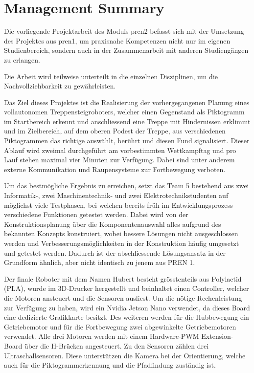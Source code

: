 \newpage
\section*{Management Summary}

Die vorliegende Projektarbeit des Moduls \acrfull{pren2} befasst sich mit der Umsetzung des Projektes aus \acrfull{pren1}, um praxisnahe Kompetenzen nicht nur im eigenen Studienbereich, sondern auch in der Zusammenarbeit mit anderen Studiengängen zu erlangen.

Die Arbeit wird teilweise unterteilt in die einzelnen Disziplinen, um die Nachvollziehbarkeit zu gewährleisten.

Das Ziel dieses Projektes ist die Realisierung der vorhergegangenen Planung eines vollautonomen Treppensteigroboters, welcher einen Gegenstand als Piktogramm im Startbereich erkennt und anschliessend eine Treppe mit Hindernissen erklimmt und im Zielbereich, auf dem oberen Podest der Treppe, aus verschiedenen Piktogrammen das richtige auswählt, berührt und diesen Fund signalisiert. Dieser Ablauf wird zweimal durchgeführt am vorbestimmten Wettkampftag und pro Lauf stehen maximal vier Minuten zur Verfügung. Dabei sind unter anderem externe Kommunikation und Raupensysteme zur Fortbewegung verboten.

Um das bestmögliche Ergebnis zu erreichen, setzt das Team 5 bestehend aus zwei Informatik-,  zwei Maschinentechnik- und zwei Elektrotechnikstudenten auf möglichst viele Testphasen, bei welchen bereits früh im Entwicklungsprozess verschiedene Funktionen getestet werden. Dabei wird von der Konstruktionsplanung über die Komponentenauswahl alles aufgrund des bekannten Konzepts konstruiert, wobei bessere Lösungen nicht ausgeschlossen werden und Verbesserungsmöglichkeiten in der Konstruktion häufig umgesetzt und getestet werden. Dadurch ist der abschliessende Lösungsansatz in der Grundform ähnlich, aber nicht identisch zu jenem aus PREN 1.

Der finale Roboter mit dem Namen \glqq Hubert\grqq{} besteht grösstenteils aus Polylactid (PLA), wurde im 3D-Drucker hergestellt und beinhaltet einen Controller, welcher die Motoren ansteuert und die Sensoren ausliest. Um die nötige Rechenleistung zur Verfügung zu haben, wird ein Nvidia Jetson Nano verwendet, da dieses Board eine dedizierte Grafikkarte besitzt. Des weiteren werden für die Hubbewegung ein Getriebemotor und für die Fortbewegung zwei abgewinkelte Getriebemotoren verwendet. Alle drei Motoren werden mit einem Hardware-PWM Extension-Board über die H-Brücken angesteuert. Zu den Sensoren zählen drei Ultraschallsensoren. Diese unterstützen die Kamera bei der Orientierung, welche auch für die Piktogrammerkennung und die Pfadfindung zuständig ist.


